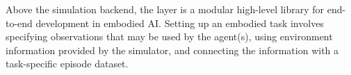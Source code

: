 Above the simulation backend, the \habitatapi layer is  a modular high-level library for end-to-end development in embodied AI.
%
%
%
Setting up an embodied task involves 
specifying observations that may be used by the agent(s), 
using environment information provided by the simulator, and 
connecting the information with a task-specific episode dataset.  

